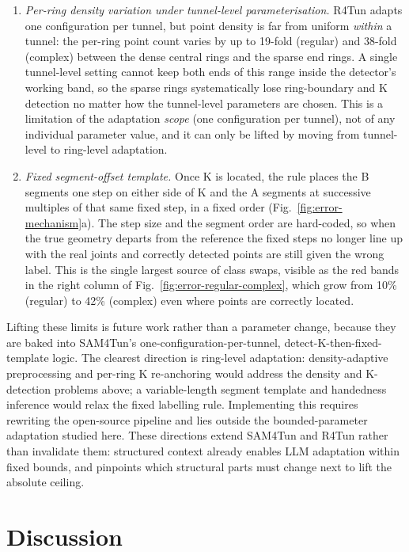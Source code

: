 \documentclass[a4paper,fleqn]{cas-dc}
\begin{document}
{\begin{enumerate}
\item \emph{Per-ring density variation under tunnel-level parameterisation.} R4Tun adapts one configuration per tunnel, but point density is far from uniform \emph{within} a tunnel: the per-ring point count varies by up to 19-fold (regular) and 38-fold (complex) between the dense central rings and the sparse end rings. A single tunnel-level setting cannot keep both ends of this range inside the detector's working band, so the sparse rings systematically lose ring-boundary and K detection no matter how the tunnel-level parameters are chosen. This is a limitation of the adaptation \emph{scope} (one configuration per tunnel), not of any individual parameter value, and it can only be lifted by moving from tunnel-level to ring-level adaptation.
\item \emph{Fixed segment-offset template.} Once K is located, the rule places the B segments one step on either side of K and the A segments at successive multiples of that same fixed step, in a fixed order (Fig.~\ref{fig:error-mechanism}a). The step size and the segment order are hard-coded, so when the true geometry departs from the reference the fixed steps no longer line up with the real joints and correctly detected points are still given the wrong label. This is the single largest source of class swaps, visible as the red bands in the right column of Fig.~\ref{fig:error-regular-complex}, which grow from 10\% (regular) to 42\% (complex) even where points are correctly located.
\end{enumerate}

Lifting these limits is future work rather than a parameter change, because they are baked into SAM4Tun's one-configuration-per-tunnel, detect-K-then-fixed-template logic. The clearest direction is ring-level adaptation: density-adaptive preprocessing and per-ring K re-anchoring would address the density and K-detection problems above; a variable-length segment template and handedness inference would relax the fixed labelling rule. Implementing this requires rewriting the open-source pipeline and lies outside the bounded-parameter adaptation studied here. These directions extend SAM4Tun and R4Tun rather than invalidate them: structured context already enables LLM adaptation within fixed bounds, and pinpoints which structural parts must change next to lift the absolute ceiling.


\section{Discussion}\label{sec:discussion}

}
\end{document}
